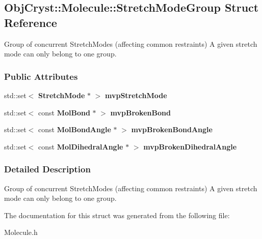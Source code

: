 \subsection{\-Obj\-Cryst\-:\-:\-Molecule\-:\-:\-Stretch\-Mode\-Group \-Struct \-Reference}
\label{a00100}


\-Group of concurrent \-Stretch\-Modes (affecting common restraints) \-A given stretch mode can only belong to one group.  


\subsubsection*{\-Public \-Attributes}
\begin{DoxyCompactItemize}
\item 
std\-::set$<$ {\bf \-Stretch\-Mode} $\ast$ $>$ {\bfseries mvp\-Stretch\-Mode}\label{a00100_a63c54cd06ab4a7b838cc686214d41750}

\item 
std\-::set$<$ const {\bf \-Mol\-Bond} $\ast$ $>$ {\bfseries mvp\-Broken\-Bond}\label{a00100_a3f6e58dc0887b43c2187080b27e2836f}

\item 
std\-::set$<$ const {\bf \-Mol\-Bond\-Angle} $\ast$ $>$ {\bfseries mvp\-Broken\-Bond\-Angle}\label{a00100_a2b325fc86d71b14c62efc683e05b0fe0}

\item 
std\-::set$<$ const \*
{\bf \-Mol\-Dihedral\-Angle} $\ast$ $>$ {\bfseries mvp\-Broken\-Dihedral\-Angle}\label{a00100_aaaee134991cbfe70408dc4b310981c63}

\end{DoxyCompactItemize}


\subsubsection{\-Detailed \-Description}
\-Group of concurrent \-Stretch\-Modes (affecting common restraints) \-A given stretch mode can only belong to one group. 



\-The documentation for this struct was generated from the following file\-:\begin{DoxyCompactItemize}
\item 
\-Molecule.\-h\end{DoxyCompactItemize}
